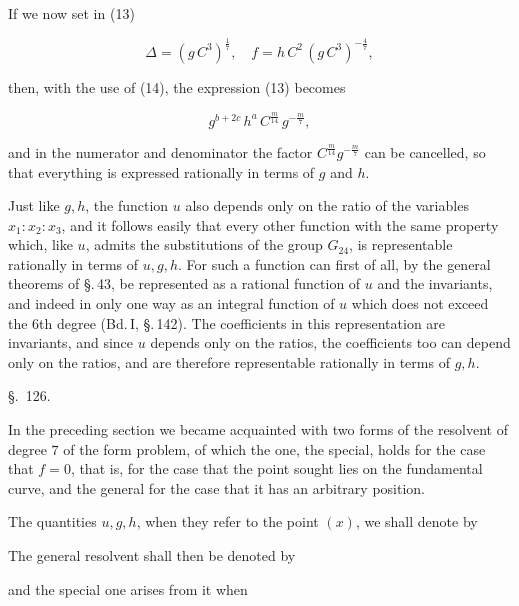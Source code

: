 If we now set in (13)

\[
\varDelta = (g\,C^3)^{\frac{1}{7}}, \quad f = h\,C^2\,(g\,C^3)^{-\frac{4}{7}},
\]

then, with the use of (14), the expression (13) becomes

\[
g^{b+2c}\,h^a\,C^{\frac{m}{14}}\,g^{-\frac{m}{7}},
\]

and in the numerator and denominator the factor $C^{\frac{m}{14}}
g^{-\frac{m}{7}}$ can be cancelled, so that everything is expressed
rationally in terms of $g$ and $h$.

Just like $g, h$, the function $u$ also depends only on the ratio of
the variables $x_1 : x_2 : x_3$, and it follows easily that every
other function with the same property which, like $u$, admits the
substitutions of the group $G_{24}$, is representable rationally in
terms of $u, g, h$. For such a function can first of all, by the
general theorems of \S.\,43, be represented as a rational function of
$u$ and the invariants, and indeed in only one way as an integral
function of $u$ which does not exceed the $6$th degree (Bd.\,I,
\S.\,142). The coefficients in this representation are invariants,
and since $u$ depends only on the ratios, the coefficients too can
depend only on the ratios, and are therefore representable rationally
in terms of $g, h$.

\begin{center}
\S.\ 126.

\end{center}

In the preceding section we became acquainted with two forms of the
resolvent of degree $7$ of the form problem, of which the one, the
special, holds for the case that $f = 0$, that is, for the case that
the point sought lies on the fundamental curve, and the general for
the case that it has an arbitrary position.

The quantities $u, g, h$, when they refer to the point $(x)$, we
shall denote by


The general resolvent shall then be denoted by


and the special one arises from it when
